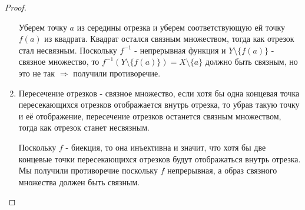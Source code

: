 \documentclass[12pt]{article}
\theoremstyle{definition}
\begin{document}
\begin{proof}
\begin{enumerate}[label ={\arabic*)}]
		Уберем точку $a$ из середины отрезка и уберем соответствующую ей точку $f(a)$ из квадрата. Квадрат остался связным множеством, тогда как отрезок стал несвязным. Поскольку $f^{-1}$ - непрерывная функция и $Y \setminus \{f(a)\}$ - связное множество, то $f^{-1}(Y \setminus \{f(a)\}) = X \setminus \{a\}$ должно быть связным, но это не так $\Rightarrow$ получили противоречие.
		\item Пересечение отрезков - связное множество, если хотя бы одна концевая точка пересекающихся отрезков отображается внутрь отрезка, то убрав такую точку и её отображение, пересечение отрезков останется связным множеством, тогда как отрезок станет несвязным. 
		
		Поскольку $f$ - биекция, то она инъективна и значит, что хотя бы две концевые точки пересекающихся отрезков будут отображаться внутрь отрезка. Мы получили противоречие поскольку $f$ непрерывная, а образ связного множества должен быть связным. 
	\end{enumerate}
\end{proof}
\end{document}
